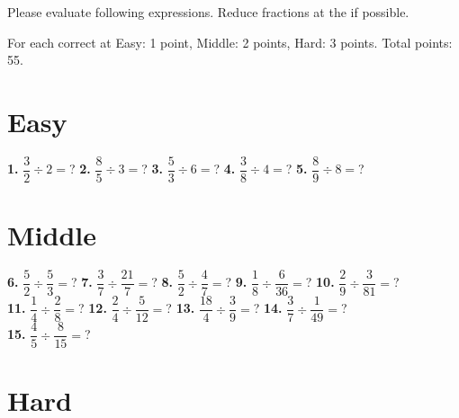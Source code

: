 \documentclass[a4paper]{article}
\begin{document}
\begin{Large}

Please evaluate following expressions. Reduce fractions at the if possible.

For each correct at Easy: 1 point, Middle: 2 points, Hard: 3 points. Total points: 55.

\section* {Easy}
		
\textbf{1.} $\dfrac{3}{2} \div 2 =$? \hspace{0.2cm}
\textbf{2.} $\dfrac{8}{5} \div 3 =$? \hspace{0.2cm}
\textbf{3.} $\dfrac{5}{3} \div 6 =$? \hspace{0.2cm}
\textbf{4.} $\dfrac{3}{8} \div 4 =$? \hspace{0.2cm}
\textbf{5.} $\dfrac{8}{9} \div 8 =$?


\section* {Middle}
		
\textbf{6.} $\dfrac{5}{2} \div \dfrac{5}{3} =$? \hspace{0.2cm}
\textbf{7.} $\dfrac{3}{7} \div \dfrac{21}{7} =$? \hspace{0.2cm}
\textbf{8.} $\dfrac{5}{2} \div \dfrac{4}{7} =$? \hspace{0.2cm}
\textbf{9.} $\dfrac{1}{8} \div \dfrac{6}{36} =$? \hspace{0.2cm}
\textbf{10.} $\dfrac{2}{9} \div \dfrac{3}{81} =$? \\[0.75cm]
\textbf{11.} $\dfrac{1}{4} \div \dfrac{2}{8}=$? \hspace{0.2cm}
\textbf{12.} $\dfrac{2}{4} \div \dfrac{5}{12} =$? \hspace{0.2cm}
\textbf{13.} $\dfrac{18}{4} \div \dfrac{3}{9} =$? \hspace{0.2cm}
\textbf{14.} $\dfrac{3}{7} \div \dfrac{1}{49} =$? \\[0.75cm]
\textbf{15.} $\dfrac{4}{5} \div \dfrac{8}{15} =$?
		
\section* {Hard}


\end{Large}
\end{document}
